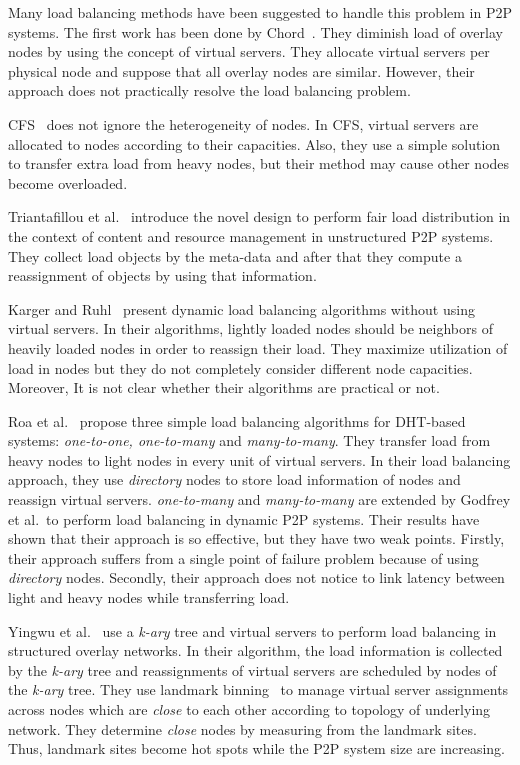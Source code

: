 \documentclass {article}
\begin{document}
Many load balancing methods have been suggested to handle this problem in P2P systems. The first work has been done by Chord~\cite{chord}. They diminish  load of overlay nodes by using the concept of virtual servers. They allocate  virtual servers per physical node and suppose that all overlay nodes are similar. However, their approach does not practically resolve the load balancing problem.

CFS~\cite{CFS} does not ignore the heterogeneity of nodes. In CFS, virtual servers are allocated to nodes according to their capacities. Also, they use a simple solution to transfer extra load from heavy nodes,
but their method may cause other nodes become overloaded.

Triantafillou et al.~\cite{ResourceSharing}  introduce the novel design to perform fair load distribution in the context of content and resource management in unstructured P2P systems. They collect load objects
by the meta-data and after that they compute a reassignment of objects by using that information.

Karger and Ruhl~\cite{kargarLoadbalancing} present dynamic load balancing algorithms without using virtual servers. In their algorithms, lightly loaded nodes should be neighbors of heavily loaded nodes in order to reassign their load. They maximize utilization of load in nodes but they do not completely consider
different node capacities. Moreover, It is not clear whether their algorithms are
 practical or not.

Roa et al.~\cite{loadbalancesp} propose three simple load balancing algorithms for DHT-based  systems: \emph{one-to-one, one-to-many} and \emph{many-to-many}. They transfer load from heavy nodes to light
 nodes in every unit of virtual servers. In their load balancing approach, they use \emph{directory} nodes to store load information of nodes and reassign virtual servers. \emph{one-to-many} and \emph{many-to-many} are extended by Godfrey et al.~\cite{loadbalancedsp}to perform load balancing in dynamic P2P systems. Their results   have shown that their approach is so effective, but they have two weak points. Firstly, their approach suffers from a single point of failure problem because of using  \emph{directory} nodes. Secondly, their approach does not notice to link latency between light and heavy nodes while transferring load.

Yingwu et al.~\cite{proximity-Awareload} use a \emph{k-ary} tree and virtual servers to perform load balancing in structured overlay networks.  In their algorithm, the load information is collected by the \emph{k-ary} tree and reassignments of virtual servers are scheduled by  nodes of the \emph{k-ary} tree. They use landmark binning~\cite{Topologically-aware-overlay} to manage virtual server assignments across nodes which are
  \emph{close} to each other according to topology of underlying network. They determine \emph{close} nodes by measuring from the landmark sites. Thus, landmark sites become hot spots  while the P2P system size are increasing.
\end{document}
